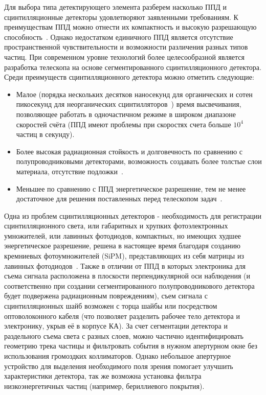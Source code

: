Для выбора типа детектирующего элемента разберем насколько ППД и сцинтилляционные детекторы удовлетворяют заявленными требованиям. К преимуществам ППД можно отнести их компактность и высокую разрешающую способность~\cite{lutz2007semiconductor}. Однако недостатком единичного ППД является отсутствие пространственной чувствительности и возможности различения разных типов частиц. При современном уровне технологий более целесообразной является разработка телескопа на основе сегментированного сцинтилляционного детектора. Среди преимуществ сцинтилляционного детектора можно отметить следующие: 
\begin{itemize}
    \item Малое (порядка нескольких десятков  наносекунд для органических и сотен пикосекунд для неорганических сцинтилляторов~\cite{shendrik2013}) время высвечивания, позволяющее работать в одночастичном режиме в широком диапазоне скоростей счёта (ППД имеют проблемы при скоростях счета больше $10^4$ частиц в секунду).
    \item Более высокая радиационная стойкость и долговечность по сравнению с полупроводниковыми детекторами, возможность создавать более толстые слои материала, отсутствие подложки~\cite{shendrik2013, lutz2007semiconductor}. 
    \item Меньшее по сравнению с ППД энергетическое разрешение, тем не менее достаточное для решения поставленных перед телескопом задач~\cite{shendrik2013, lutz2007semiconductor}. 
\end{itemize} 
Одна из проблем сцинтилляционных детекторов - необходимость для регистрации сцинтилляционного света, или габаритных и хрупких  фотоэлектронных умножителей, или лавинных фотодиодов, компактных, но имеющих худшее энергетическое разрешение, решена в настоящее время благодаря созданию кремниевых фотоумножителей (SiPM), представляющих из себя матрицы из лавинных фотодиодов~\cite{akimov2006}. Также в отличии от ППД в которых  электроника для съема сигнала расположена в плоскости перпендикулярной оси наблюдения (и соответственно при создании сегментированного полупроводникового детектора будет подвержена радиационным повреждениям), съем сигнала с сцинтилляционных шайб возможен с торца шайбы или посредством оптоволоконного кабеля (что позволяет разделить рабочее тело детектора и электронику, укрыв её в корпусе КА). За счет сегментации детектора и раздельного съема света с разных слоев, можно частично идентифицировать геометрию трека частицы и фильтровать события в нужном апертурном окне без использования громоздких коллиматоров. Однако небольшое апертурное устройство для выделения необходимого поля зрения помогает улучшить характеристики детектора, так же возможна установка фильтра низкоэнергетичных частиц (например, бериллиевого покрытия).

